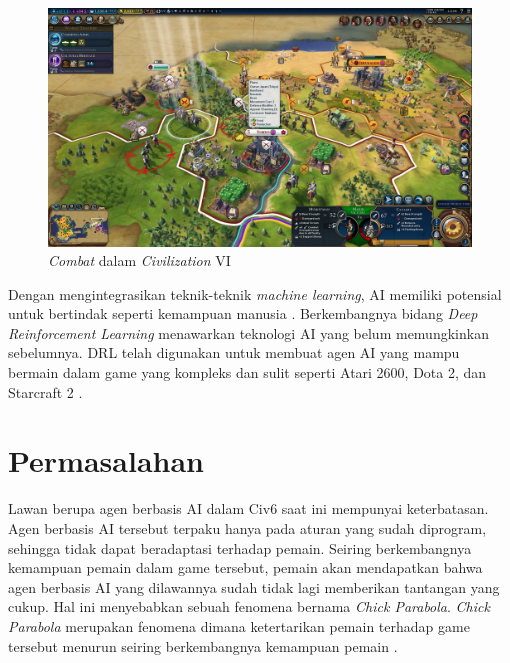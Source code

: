 \begin{figure}[H]
    \centering
      \includegraphics[scale=0.2]{gambar/civ6_screenshot.png}
      \caption{\emph{Combat} dalam \emph{Civilization} VI}
      \label{fig:civ6_combat_image}
  \end{figure}

Dengan mengintegrasikan teknik-teknik \emph{machine learning}, AI memiliki potensial untuk bertindak seperti kemampuan manusia \citep{humanLevelAI}.
Berkembangnya bidang \emph{Deep Reinforcement Learning} menawarkan teknologi AI yang belum memungkinkan sebelumnya. 
DRL telah digunakan untuk membuat agen AI yang mampu bermain dalam game yang kompleks dan sulit seperti Atari 2600, Dota 2, dan Starcraft 2 \citep{DRLSurvey}.

\section{Permasalahan}
\label{sec:permasalahan}

Lawan berupa agen berbasis AI dalam Civ6 saat ini mempunyai keterbatasan. 
Agen berbasis AI tersebut terpaku hanya pada aturan yang sudah diprogram, 
sehingga tidak dapat beradaptasi terhadap pemain. 
Seiring berkembangnya kemampuan pemain dalam game tersebut, 
pemain akan mendapatkan bahwa agen berbasis AI yang dilawannya sudah tidak lagi 
memberikan tantangan yang cukup. Hal ini menyebabkan sebuah fenomena bernama \emph{Chick Parabola}. 
\emph{Chick Parabola} merupakan fenomena dimana ketertarikan pemain terhadap game tersebut menurun seiring berkembangnya kemampuan pemain \citep{chickParabola}.

